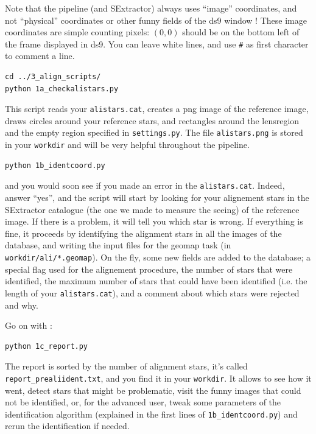 Note that the pipeline (and SExtractor) always uses ``image'' coordinates, and not ``physical'' coordinates or other funny fields of the ds9 window ! These image coordinates are simple counting pixels: $(0,0)$ should be on the bottom left of the frame displayed in ds9.
You can leave white lines, and use \verb+#+ as first character to comment a line. 

\begin{Verbatim}
cd ../3_align_scripts/
python 1a_checkalistars.py
\end{Verbatim}
This script reads your \verb+alistars.cat+, creates a png image of the reference image, draws circles around your reference stars, and rectangles around the lensregion and the empty region specified in \verb+settings.py+. The file \verb+alistars.png+ is stored in your \verb+workdir+ and will be very helpful throughout the pipeline.

\begin{Verbatim}
python 1b_identcoord.py
\end{Verbatim}
and you would soon see if you made an error in the \verb+alistars.cat+. Indeed, answer ``yes'', and the script will start by looking for your alignement stars in the SExtractor catalogue (the one we made to measure the seeing) of the reference image. If there is a problem, it will tell you which star is wrong. If everything is fine, it proceeds by identifying the alignment stars in all the images of the database, and writing the input files for the geomap task (in \verb+workdir/ali/*.geomap+). On the fly, some new fields are added to the database; a special flag used for the alignement procedure, the number of stars that were identified, the maximum number of stars that could have been identified (i.e. the length of your \verb+alistars.cat+), and a comment about which stars were rejected and why.

Go on with :

\begin{Verbatim}
python 1c_report.py
\end{Verbatim}

The report is sorted by the number of alignment stars, it's called
\verb+report_prealiident.txt+, and you find it in your \verb+workdir+. It allows
to see how it went, detect stars that might be problematic, visit the funny
images that could not be identified, or, for the advanced user, tweak some
parameters of the identification algorithm (explained in the first lines of
\verb+1b_identcoord.py+) and rerun the identification if needed.


